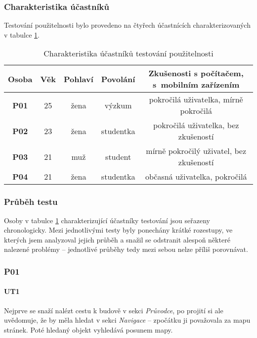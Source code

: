 \subsubsection{Charakteristika účastníků}
Testování použitelnosti bylo provedeno na čtyřech účastnících charakterizovaných v tabulce \ref{tab:charakteristikaUcastniku}. %
\begin{table}
\begin{center}
\begin{threeparttable}
\begin{tabular}{|c|c|c|c|c|}
\hline
\textbf{Osoba} & \textbf{Věk} & \textbf{Pohlaví} & \textbf{Povolání} & \parbox{2.2in}{\smallskip\textbf{Zkušenosti s počítačem, s~mobilním zařízením}\smallskip} \\
\hline
\textbf{P01} & 25 & žena & výzkum & \parbox{2.2in}{\smallskip pokročilá uživatelka, mírně pokročilá\smallskip} \\
\textbf{P02} & 23 & žena & studentka & \parbox{2.2in}{\smallskip pokročilá uživatelka, bez zkušeností\smallskip} \\
\textbf{P03} & 21 & muž & student & \parbox{2.2in}{\smallskip mírně pokročilý uživatel, bez zkušeností\smallskip} \\
\textbf{P04} & 21 & žena & studentka & \parbox{2.2in}{\smallskip občasná uživatelka, pokročilá\smallskip} \\
\hline
\end{tabular}
\caption{Charakteristika účastníků testování použitelnosti}
\label{tab:charakteristikaUcastniku}
\end{threeparttable}
\end{center}
\end{table}

\subsubsection{Průběh testu}
Osoby v tabulce \ref{tab:charakteristikaUcastniku} charakterizující účastníky testování jsou seřazeny chronologicky. Mezi jednotlivými testy byly ponechány krátké rozestupy, ve kterých jsem analyzoval jejich průběh a snažil se odstranit alespoň některé nalezené problémy -- jednotlivé průběhy tedy mezi sebou nelze příliš porovnávat.
\subsubsection*{P01}
\paragraph*{UT1}
Nejprve se snaží nalézt cestu k budově v sekci \textit{Průvodce}, po projití si ale uvědomuje, že by měla hledat v sekci \textit{Navigace} -- zpočátku ji považovala za mapu stránek. Poté hledaný objekt vyhledává posunem mapy.
